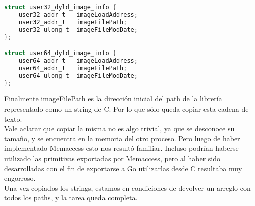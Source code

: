 \begin{lstlisting}[language=C]
struct user32_dyld_image_info {
	user32_addr_t	imageLoadAddress;
	user32_addr_t	imageFilePath;
	user32_ulong_t	imageFileModDate;
};

struct user64_dyld_image_info {
	user64_addr_t	imageLoadAddress;
	user64_addr_t	imageFilePath;
	user64_ulong_t	imageFileModDate;
};
\end{lstlisting}

Finalmente imageFilePath es la dirección inicial del path de la librería
representado como un string de C. Por lo que sólo queda copiar esta cadena de
texto.\\

Vale aclarar que copiar la misma no es algo trivial, ya que se desconoce su
tamaño, y se encuentra en la memoria del otro proceso. Pero luego de haber
implementado Memaccess esto nos resultó familiar. Incluso podrían haberse
utilizado las primitivas exportadas por Memaccess, pero al haber sido
desarrolladas con el fin de exportarse a Go utilizarlas desde C resultaba muy
engorroso.\\

Una vez copiados los strings, estamos en condiciones de devolver un arreglo con
todos los paths, y la tarea queda completa.\\

